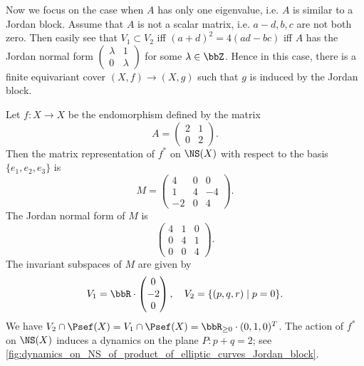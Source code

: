     Now we focus on the case when \(A\) has only one eigenvalue, i.e. \(A\) is similar to a Jordan block.
    Assume that \(A\) is not a scalar matrix, i.e. \(a-d,b,c\) are not both zero.
    Then easily see that \(V_1 \subset V_2\) iff \((a+d)^2 = 4(ad-bc)\) iff \(A\) has the Jordan normal form \(\begin{pmatrix}
        \lambda & 1 \\
        0 & \lambda
    \end{pmatrix}\) for some \(\lambda \in \bbZ\).
    Hence in this case, there is a finite equivariant cover \((X,f) \to (X,g)\) such that \(g\) is induced by the Jordan block.

    \begin{example}\label{eg:Jordan_block_acts_on_NS_by_endomorphism_of_product_of_elliptic_curves}
        Let \(f: X \to X\) be the endomorphism defined by the matrix
        \[ A = \begin{pmatrix}
            2 & 1 \\
            0 & 2
        \end{pmatrix}. \]
        Then the matrix representation of \(f^*\) on \(\NS(X)\) with respect to the basis \(\{e_1, e_2, e_3\}\) is
        \[
            M = \begin{pmatrix}
                4 & 0 & 0 \\
                1 & 4 & -4 \\
                -2 & 0 & 4
            \end{pmatrix}. 
        \]
        The Jordan normal form of \(M\) is
        \[
            \begin{pmatrix}
                4 & 1 & 0 \\
                0 & 4 & 1 \\
                0 & 0 & 4
            \end{pmatrix}.
        \]
        The invariant subspaces of \(M\) are given by
        \[ V_1 = \bbR \cdot \begin{pmatrix}
            0 \\
            -2 \\
            0
        \end{pmatrix}, \quad V_2 = \{(p,q,r) \mid p = 0\}. \]
        We have \(V_2 \cap \Psef(X) = V_1 \cap \Psef(X) = \bbR_{\geq 0} \cdot (0,1,0)^T\).
        The action of \(f^*\) on \(\NS(X)\) induces a dynamics on the plane \(P: p+q=2\); see \cref{fig:dynamics_on_NS_of_product_of_elliptic_curves_Jordan_block}.
    \end{example}
